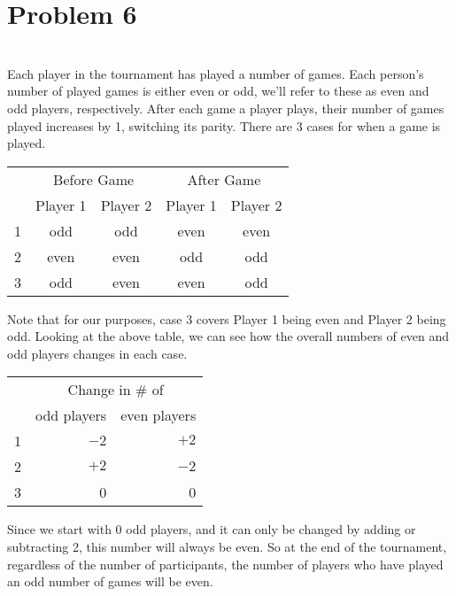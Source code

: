 \documentclass[12pt]{article}
\begin{document}
\newpage
\section*{Problem 6}
\\

Each player in the tournament has played a number of games. Each person's number of played games is either even or odd, we'll refer to these as even and odd players, respectively. After each game a player plays, their number of games played increases by 1, switching its parity. There are 3 cases for when a game is played. 
\begin{center}
    \begin{tabular}{c c c|c c}
        & \multicolumn{2}{c}{Before Game} & \multicolumn{2}{c}{After Game} \\
        & Player 1 & Player 2 & Player 1 & Player 2\\
        \hline
        1 & odd & odd & even & even \\
        2 & even & even & odd & odd\\
        3 & odd & even & even & odd\\
    \end{tabular}
\end{center}

Note that for our purposes, case 3 covers Player 1 being even and Player 2 being odd. Looking at the above table, we can see how the overall numbers of even and odd players changes in each case.
\begin{center}
    \begin{tabular}{c r r}
        & \multicolumn{2}{c}{Change in \# of}\\
        & odd players & even players\\
        \hline
        1 & $-2$ & $+2$\\
        2 & $+2$ & $-2$\\
        3 & 0 & 0\\
    \end{tabular}
\end{center}

Since we start with 0 odd players, and it can only be changed by adding or subtracting 2, this number will always be even. So at the end of the tournament, regardless of the number of participants, the number of players who have played an odd number of games will be even. 
\end{document}
